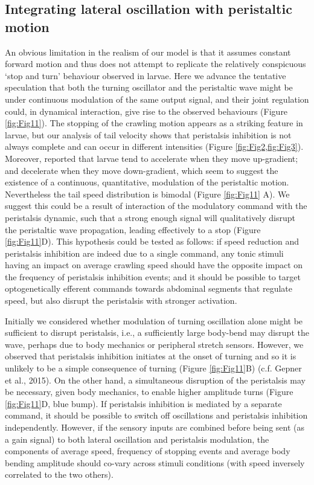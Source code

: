 \documentclass[10pt,a4paper]{article}
\begin{document}
\subsection{Integrating lateral oscillation with peristaltic motion}
An obvious limitation in the realism of our model is that it assumes constant forward motion and thus does not attempt to replicate the relatively conspicuous ‘stop and turn’ behaviour observed in larvae. Here we advance the tentative speculation that both the turning oscillator and the peristaltic wave might be under continuous modulation of the same output signal, and their joint regulation could, in dynamical interaction, give rise to the observed behaviours (Figure \ref{fig:Fig11}). The stopping of the crawling motion appears as a striking feature in larvae, but our analysis of tail velocity shows that peristalsis inhibition is not always complete and can occur in different intensities (Figure \ref{fig:Fig2,fig:Fig3}). Moreover, \cite{gomez2014multilevel} reported that larvae tend to accelerate when they move up-gradient; and decelerate when they move down-gradient, which seem to suggest the existence of a continuous, quantitative, modulation of the peristaltic motion. Nevertheless the tail speed distribution is bimodal (Figure \ref{fig:Fig11} A). We suggest this could be a result of interaction of the modulatory command with the peristalsis dynamic, such that a strong enough signal will qualitatively disrupt the peristaltic wave propagation, leading effectively to a stop (Figure \ref{fig:Fig11}D). This hypothesis could be tested as follows: if speed reduction and peristalsis inhibition are indeed due to a single command, any tonic stimuli having an impact on average crawling speed should have the opposite impact on the frequency of peristalsis inhibition events; and it should be possible to target optogenetically efferent commands towards abdominal segments that regulate speed, but also disrupt the peristalsis with stronger activation.

Initially we considered whether modulation of turning oscillation alone might be sufficient to disrupt peristalsis, i.e., a sufficiently large body-bend may disrupt the wave, perhaps due to body mechanics or peripheral stretch sensors. However, we observed that peristalsis inhibition initiates at the onset of turning and so it is unlikely to be a simple consequence of turning (Figure \ref{fig:Fig11}B) (c.f. Gepner et al., 2015). On the other hand, a simultaneous disruption of the peristalsis may be necessary, given body mechanics, to enable higher amplitude turns (Figure \ref{fig:Fig11}D, blue bump). If peristalsis inhibition is mediated by a separate command, it should be possible to switch off oscillations and peristalsis inhibition independently.  However, if the sensory inputs are combined before being sent (as a gain signal) to both lateral oscillation and peristalsis modulation, the components of average speed, frequency of stopping events and average body bending amplitude should co-vary across stimuli conditions (with speed inversely correlated to the two others). 
\end{document}
